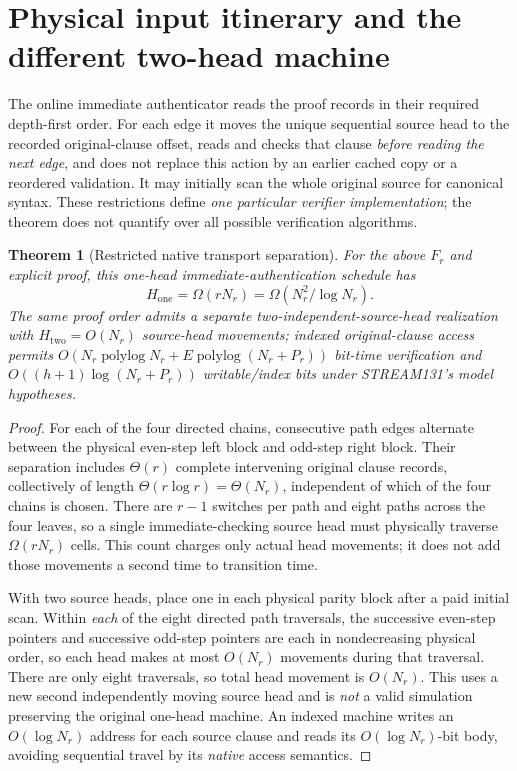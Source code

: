 \documentclass[11pt]{article}
\newtheorem{theorem}{Theorem}
\begin{document}
\section{Physical input itinerary and the different two-head machine}
The online immediate authenticator reads the proof records in their required depth-first order. For each edge it moves the unique sequential source head to the recorded original-clause offset, reads and checks that clause \emph{before reading the next edge}, and does not replace this action by an earlier cached copy or a reordered validation. It may initially scan the whole original source for canonical syntax. These restrictions define \emph{one particular verifier implementation}; the theorem does not quantify over all possible verification algorithms.

\begin{theorem}[Restricted native transport separation]\label{th:transport}
For the above $F_r$ and explicit proof, this one-head immediate-authentication schedule has
\[
H_{\mathrm{one}}=\Omega(rN_r)=\Omega(N_r^2/\log N_r).
\tag{2}
\]
The same proof order admits a separate two-independent-source-head realization with $H_{\mathrm{two}}=O(N_r)$ source-head movements; indexed original-clause access permits $O(N_r\operatorname{polylog}N_r+E\operatorname{polylog}(N_r+P_r))$ bit-time verification and $O((h+1)\log(N_r+P_r))$ writable/index bits under STREAM131's model hypotheses.
\end{theorem}
\begin{proof}
For each of the four directed chains, consecutive path edges alternate between the physical even-step left block and odd-step right block. Their separation includes $\Theta(r)$ complete intervening original clause records, collectively of length $\Theta(r\log r)=\Theta(N_r)$, independent of which of the four chains is chosen. There are $r-1$ switches per path and eight paths across the four leaves, so a single immediate-checking source head must physically traverse $\Omega(rN_r)$ cells. This count charges only actual head movements; it does not add those movements a second time to transition time.

With two source heads, place one in each physical parity block after a paid initial scan. Within \emph{each} of the eight directed path traversals, the successive even-step pointers and successive odd-step pointers are each in nondecreasing physical order, so each head makes at most $O(N_r)$ movements during that traversal. There are only eight traversals, so total head movement is $O(N_r)$. This uses a new second independently moving source head and is \emph{not} a valid simulation preserving the original one-head machine. An indexed machine writes an $O(\log N_r)$ address for each source clause and reads its $O(\log N_r)$-bit body, avoiding sequential travel by its \emph{native} access semantics.\end{proof}
\end{document}
